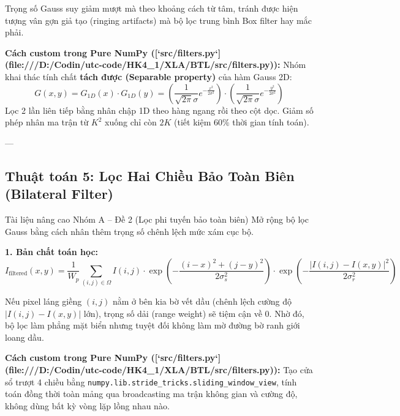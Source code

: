 \documentclass[11pt,a4paper]{article}
\begin{document}
\begin{whyuse}
Trọng số Gauss suy giảm mượt mà theo khoảng cách từ tâm, tránh được hiện tượng vân gợn giả tạo (ringing artifacts) mà bộ lọc trung bình Box filter hay mắc phải.
\end{whyuse}

\begin{custombox}
\textbf{Cách custom trong Pure NumPy ([`src/filters.py`](file:///D:/Codin/utc-code/HK4_1/XLA/BTL/src/filters.py)):}
Nhóm khai thác tính chất \textbf{tách được (Separable property)} của hàm Gauss 2D:
\begin{equation}
G(x, y) = G_{1D}(x) \cdot G_{1D}(y) = \left( \frac{1}{\sqrt{2\pi}\sigma} e^{-\frac{x^2}{2\sigma^2}} \right) \cdot \left( \frac{1}{\sqrt{2\pi}\sigma} e^{-\frac{y^2}{2\sigma^2}} \right)
\end{equation}
Lọc 2 lần liên tiếp bằng nhân chập 1D theo hàng ngang rồi theo cột dọc. Giảm số phép nhân ma trận từ $K^2$ xuống chỉ còn $2K$ (tiết kiệm $60\%$ thời gian tính toán).
\end{custombox}

---

\subsection{Thuật toán 5: Lọc Hai Chiều Bảo Toàn Biên (Bilateral Filter)}
\begin{slidemapping}{Tài liệu nâng cao Nhóm A -- Đề 2 (Lọc phi tuyến bảo toàn biên)}
Mở rộng bộ lọc Gauss bằng cách nhân thêm trọng số chênh lệch mức xám cục bộ.
\end{slidemapping}

\textbf{1. Bản chất toán học:}
\begin{equation}
I_{\text{filtered}}(x, y) = \frac{1}{W_p} \sum_{(i, j) \in \Omega} I(i, j) \cdot \exp\left( -\frac{(i-x)^2 + (j-y)^2}{2\sigma_s^2} \right) \cdot \exp\left( -\frac{|I(i, j) - I(x, y)|^2}{2\sigma_r^2} \right)
\end{equation}

\begin{whyuse}
Nếu pixel láng giềng $(i, j)$ nằm ở bên kia bờ vết dầu (chênh lệch cường độ $|I(i, j) - I(x, y)|$ lớn), trọng số dải (range weight) sẽ tiệm cận về 0. Nhờ đó, bộ lọc làm phẳng mặt biển nhưng tuyệt đối không làm mờ đường bờ ranh giới loang dầu.
\end{whyuse}

\begin{custombox}
\textbf{Cách custom trong Pure NumPy ([`src/filters.py`](file:///D:/Codin/utc-code/HK4_1/XLA/BTL/src/filters.py)):}
Tạo cửa sổ trượt 4 chiều bằng \lstinline|numpy.lib.stride_tricks.sliding_window_view|, tính toán đồng thời toàn mảng qua broadcasting ma trận không gian và cường độ, không dùng bất kỳ vòng lặp lồng nhau nào.
\end{custombox}
\end{document}
